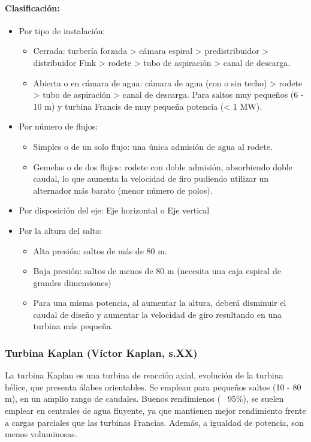 \paragraph{Clasificación:}
\begin{itemize}
    \item Por tipo de instalación:
    \begin{itemize}
        \item Cerrada: turbería forzada > cámara espiral > predistribuidor > distribuidor Fink > rodete > tubo de aspiración > canal de descarga.
        \item Abierta o en cámara de agua: cámara de agua (con o sin techo) > rodete > tubo de aspiración > canal de descarga. Para saltos muy pequeños (6 - 10 m) y turbina Francis de muy pequeña potencia (< 1 MW).
    \end{itemize}
    \item Por número de flujos:
    \begin{itemize}
        \item Simples o de un solo flujo: una única admisión de agua al rodete.
        \item Gemelas o de dos flujos: rodete con doble admisión, absorbiendo doble caudal, lo que aumenta la velocidad de firo pudiendo utilizar un alternador más barato (menor número de polos).
    \end{itemize}
    \item Por disposición del eje: Eje horizontal o Eje vertical
    \item Por la altura del salto:
    \begin{itemize}
        \item Alta presión: saltos de más de 80 m.
        \item Baja presión: saltos de menos de 80 m (necesita una caja espiral de grandes dimensiones)
        \item Para una misma potencia, al aumentar la altura, deberá disminuir el caudal de diseño y aumentar la velocidad de giro resultando en una turbina más pequeña.
    \end{itemize}
\end{itemize}

\subsubsection{Turbina Kaplan (Víctor Kaplan, s.XX)}
La turbina Kaplan es una turbina de reacción axial, evolución de la turbina hélice, que presenta álabes orientables. Se emplean para pequeños saltos (10 - 80 m), en un amplio rango de caudales. Buenos rendimienos (~ 95\%), se suelen emplear en centrales de agua fluyente, ya que mantienen mejor rendimiento frente a cargas parciales que las turbinas Francias. Además, a igualdad de potencia, son menos voluminosas.


